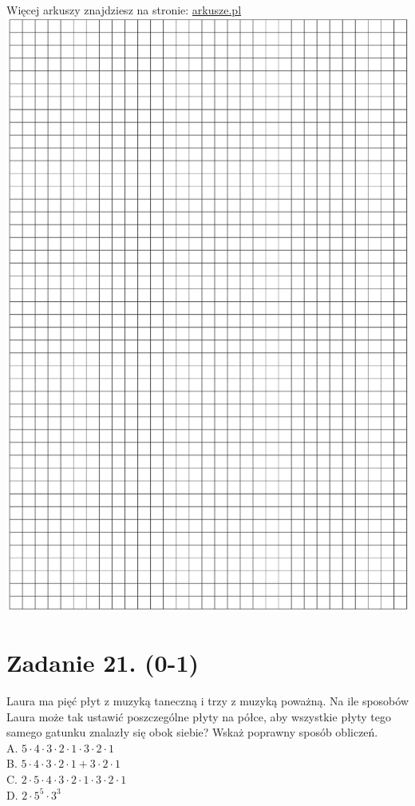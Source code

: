 \documentclass[10pt]{article}
\begin{document}
Więcej arkuszy znajdziesz na stronie: \href{http://arkusze.pl}{arkusze.pl}\\
\includegraphics[max width=\textwidth, center]{2024_11_21_72158d4a4efa7dd894bcg-09}

\section*{Zadanie 21. (0-1)}
Laura ma pięć płyt z muzyką taneczną i trzy z muzyką poważną. Na ile sposobów Laura może tak ustawić poszczególne płyty na półce, aby wszystkie płyty tego samego gatunku znalazły się obok siebie? Wskaż poprawny sposób obliczeń.\\
A. \(5 \cdot 4 \cdot 3 \cdot 2 \cdot 1 \cdot 3 \cdot 2 \cdot 1\)\\
B. \(5 \cdot 4 \cdot 3 \cdot 2 \cdot 1+3 \cdot 2 \cdot 1\)\\
C. \(2 \cdot 5 \cdot 4 \cdot 3 \cdot 2 \cdot 1 \cdot 3 \cdot 2 \cdot 1\)\\
D. \(2 \cdot 5^{5} \cdot 3^{3}\)
\end{document}
